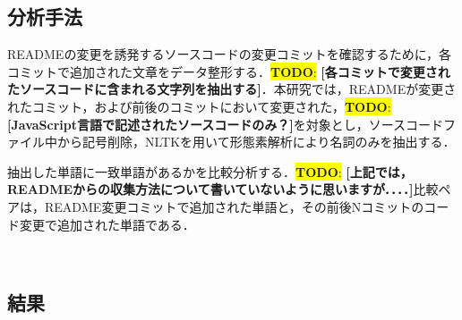 \documentclass[uplatex,dvipdfmx,a4paper,twocolumn,base=11pt,jbase=11pt,ja=standard]{bxjsarticle}  %
\newcommand{\todo}[1]{\colorbox{yellow}{{\bf TODO}:}{\color{red} {\textbf{[#1]}}}}
\begin{document}
\subsection{分析手法}


READMEの変更を誘発するソースコードの変更コミットを確認するために，各コミットで追加された文章をデータ整形する．\todo{各コミットで変更されたソースコードに含まれる文字列を抽出する}．本研究では，READMEが変更されたコミット，および前後のコミットにおいて変更された，\todo{JavaScript言語で記述されたソースコードのみ？}を対象とし，ソースコードファイル中から記号削除，NLTKを用いて形態素解析により名詞のみを抽出する．

%
%

抽出した単語に一致単語があるかを比較分析する．\todo{上記では，READMEからの収集方法について書いていないように思いますが．．．．}比較ペアは，README変更コミットで追加された単語と，その前後Nコミットのコード変更で追加された単語である．



\subsection{結果}
\end{document}
